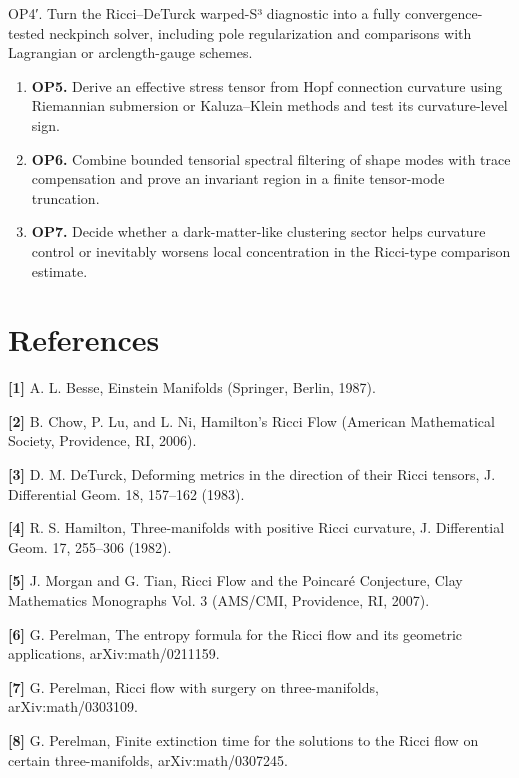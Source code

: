 \documentclass[
]{article}
\begin{document}
OP4′. Turn the Ricci--DeTurck warped-S³ diagnostic into a fully convergence-tested neckpinch solver, including pole regularization and comparisons with Lagrangian or arclength-gauge schemes.

\begin{enumerate}
\def\labelenumi{(\arabic{enumi})}
\setcounter{enumi}{38}
\item
  \textbf{OP5.} Derive an effective stress tensor from Hopf connection curvature using Riemannian submersion or Kaluza--Klein methods and test its curvature-level sign.
\item
  \textbf{OP6.} Combine bounded tensorial spectral filtering of shape modes with trace compensation and prove an invariant region in a finite tensor-mode truncation.
\item
  \textbf{OP7.} Decide whether a dark-matter-like clustering sector helps curvature control or inevitably worsens local concentration in the Ricci-type comparison estimate.
\end{enumerate}

\section{References}\label{references}

\textbf{{[}1{]}} A. L. Besse, Einstein Manifolds (Springer, Berlin, 1987).

\textbf{{[}2{]}} B. Chow, P. Lu, and L. Ni, Hamilton's Ricci Flow (American Mathematical Society, Providence, RI, 2006).

\textbf{{[}3{]}} D. M. DeTurck, Deforming metrics in the direction of their Ricci tensors, J. Differential Geom. 18, 157--162 (1983).

\textbf{{[}4{]}} R. S. Hamilton, Three-manifolds with positive Ricci curvature, J. Differential Geom. 17, 255--306 (1982).

\textbf{{[}5{]}} J. Morgan and G. Tian, Ricci Flow and the Poincaré Conjecture, Clay Mathematics Monographs Vol. 3 (AMS/CMI, Providence, RI, 2007).

\textbf{{[}6{]}} G. Perelman, The entropy formula for the Ricci flow and its geometric applications, arXiv:math/0211159.

\textbf{{[}7{]}} G. Perelman, Ricci flow with surgery on three-manifolds, arXiv:math/0303109.

\textbf{{[}8{]}} G. Perelman, Finite extinction time for the solutions to the Ricci flow on certain three-manifolds, arXiv:math/0307245.
\end{document}
